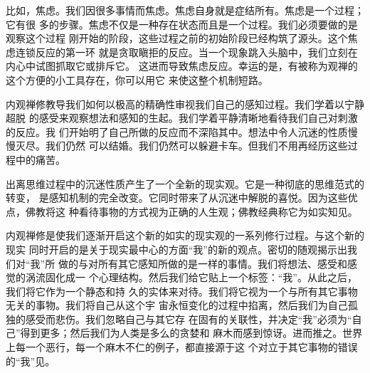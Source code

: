 比如，焦虑。我们因很多事情而焦虑。焦虑自身就是症结所有。焦虑是一个过程；它有很
多的步骤。焦虑不仅是一种存在状态而且是一个过程。我们必须要做的是观察这个过程
刚开始的阶段，这些过程之前的初始阶段已经构筑了源头。这个焦虑连锁反应的第一环
就是贪取瞋拒的反应。当一个现象跳入头脑中，我们立刻在内心中试图抓取它或排斥它。
这进而导致焦虑反应。幸运的是，有被称为观禅的这个方便的小工具存在，你可以用它
来使这整个机制短路。

内观禅修教导我们如何以极高的精确性审视我们自己的感知过程。我们学着以宁静超脱
的感受来观察想法和感知的生起。我们学着平静清晰地看待我们自己对刺激的反应。我
们开始明了自己所做的反应而不深陷其中。想法中令人沉迷的性质慢慢灭尽。我们仍然
可以结婚。我们仍然可以躲避卡车。但我们不用再经历这些过程中的痛苦。

出离思维过程中的沉迷性质产生了一个全新的现实观。它是一种彻底的思维范式的转变，
是感知机制的完全改变。它同时带来了从沉迷中解脱的喜悦。因为这些优点，佛教将这
种看待事物的方式视为正确的人生观；佛教经典称它为如实知见。

内观禅修是使我们逐渐开启这个新的如实的现实观的一系列修行过程。与这个新的现实
同时开启的是关于现实最中心的方面“我”的新的观点。密切的随观揭示出我们对“我”所
做的与对所有其它感知所做的是一样的事情。我们将想法、感受和感觉的涡流固化成一
个心理结构。然后我们给它贴上一个标签：“我”。从此之后，我们将它作为一个静态和持
久的实体来对待。我们将它视为一个与所有其它事物无关的事物。我们将自己从这个宇
宙永恒变化的过程中掐离，然后我们为自己孤独的感受而悲伤。我们忽略自己与其它存
在固有的关联性，并决定“我”必须为“自己”得到更多；然后我们为人类是多么的贪婪和
麻木而感到惊讶。进而推之。世界上每一个恶行，每一个麻木不仁的例子，都直接源于这
个对立于其它事物的错误的“我”见。


\endchapter

\byebye
